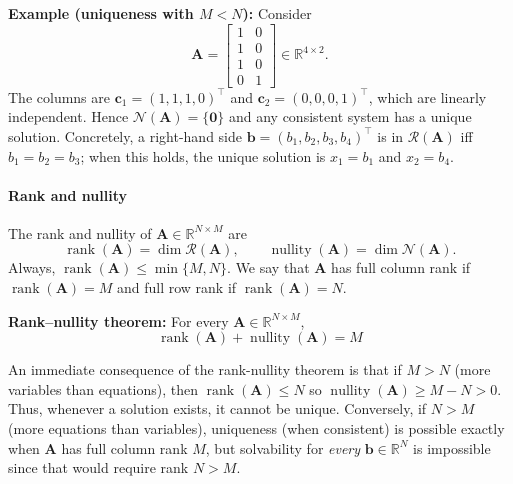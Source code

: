 \begin{exampleBox}
\textbf{Example (uniqueness with $M<N$):} Consider
\[
\mathbf{A}=\begin{bmatrix}
1&0\\ 1&0\\ 1&0\\ 0&1
\end{bmatrix}\in\mathbb{R}^{4\times 2}.
\]
The columns are $\mathbf{c}_1=(1,1,1,0)^{\top}$ and $\mathbf{c}_2=(0,0,0,1)^{\top}$, which are linearly independent. Hence $\mathcal{N}(\mathbf{A})=\{\mathbf{0}\}$ and any consistent system has a unique solution. Concretely, a right-hand side $\mathbf{b}=(b_1,b_2,b_3,b_4)^{\top}$ is in $\mathcal{R}(\mathbf{A})$ iff $b_1=b_2=b_3$; when this holds, the unique solution is $x_1=b_1$ and $x_2=b_4$.
\end{exampleBox}

\paragraph{Rank and nullity} The rank and nullity of $\mathbf{A}\in\mathbb{R}^{N\times M}$ are
\[
\operatorname{rank}(\mathbf{A})=\dim\mathcal{R}(\mathbf{A}),
\qquad
\operatorname{nullity}(\mathbf{A})=\dim\mathcal{N}(\mathbf{A}).
\]
Always, $\operatorname{rank}(\mathbf{A})\le \min\{M,N\}$. We say that $\mathbf{A}$ has full column rank if $\operatorname{rank}(\mathbf{A})=M$ and full row rank if $\operatorname{rank}(\mathbf{A})=N$.

\begin{theoremBox}
\textbf{Rank--nullity theorem:}
For every $\mathbf{A}\in\mathbb{R}^{N\times M}$,
\[
\operatorname{rank}(\mathbf{A})+\operatorname{nullity}(\mathbf{A})=M
\]
\end{theoremBox}
An immediate consequence of the rank-nullity theorem is that if $M>N$ (more variables than equations), then $\operatorname{rank}(\mathbf{A})\le N$ so $\operatorname{nullity}(\mathbf{A})\ge M-N>0$. Thus, whenever a solution exists, it cannot be unique. Conversely, if $N>M$ (more equations than variables), uniqueness (when consistent) is possible exactly when $\mathbf{A}$ has full column rank $M$, but solvability for \emph{every} $\mathbf{b}\in\mathbb{R}^N$ is impossible since that would require rank $N>M$.

